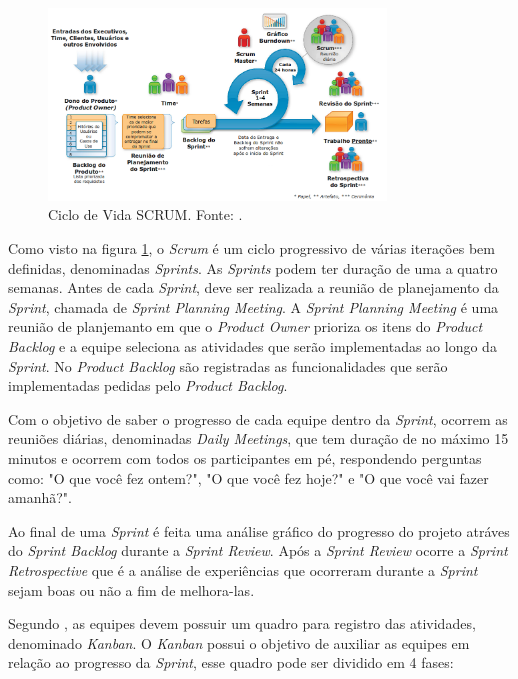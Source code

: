 \begin{figure}[H]
	\centering
	\includegraphics[width=0.8\textwidth]{figuras/ciclo_de_vida_scrum.png}
	\caption{Ciclo de Vida SCRUM. Fonte: \cite{scrum}.}
	\label{img:ciclo_de_vida_scrum}
\end{figure}

Como visto na figura \ref{img:ciclo_de_vida_scrum}, o \textit{Scrum} é um ciclo progressivo de várias iterações bem definidas, denominadas \textit{Sprints}. As \textit{Sprints} podem ter duração de uma a quatro semanas. Antes de cada \textit{Sprint}, deve ser realizada a reunião de planejamento da \textit{Sprint}, chamada de \textit{Sprint Planning Meeting}. A \textit{Sprint Planning Meeting} é uma reunião de planjemanto em que o \textit{Product Owner}
prioriza os itens do \textit{Product Backlog} e a equipe seleciona as atividades que serão implementadas ao longo da \textit{Sprint}. No \textit{Product Backlog} são registradas as funcionalidades que serão implementadas pedidas pelo \textit{Product Backlog}. 

Com o objetivo de saber o progresso de cada equipe dentro da \textit{Sprint}, ocorrem as reuniões diárias, denominadas \textit{Daily Meetings}, que tem duração de no máximo 15 minutos e ocorrem com todos os participantes em pé, respondendo perguntas como: "O que você fez ontem?", "O que você fez hoje?" e "O que você vai fazer amanhã?". 

Ao final de uma \textit{Sprint} é feita uma análise gráfico do progresso do projeto atráves do \textit{Sprint Backlog} durante a \textit{Sprint Review}. Após a \textit{Sprint Review} ocorre a \textit{Sprint Retrospective} que é a análise de experiências que ocorreram durante a \textit{Sprint} sejam boas ou não a fim de melhora-las.

Segundo \cite{fowler}, as equipes devem possuir um quadro para registro das atividades, denominado \textit{Kanban}. O \textit{Kanban} possui o objetivo de auxiliar as equipes em relação ao progresso da \textit{Sprint}, esse quadro pode ser dividido em 4 fases:

